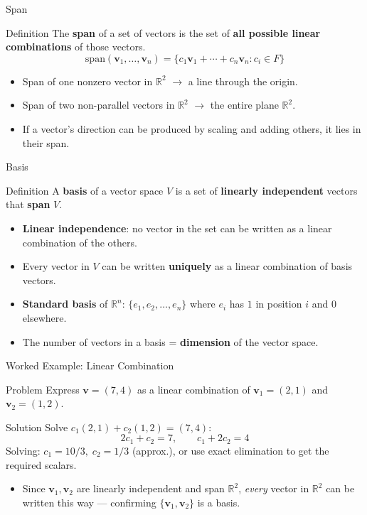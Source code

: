 \documentclass[9pt,aspectratio=169]{beamer}
\newcommand{\R}{\mathbb{R}}
\newcommand{\vect}[1]{\mathbf{#1}}
\begin{document}
\begin{frame}{Span}
\begin{block}{Definition}
The \textbf{span} of a set of vectors is the set of \textbf{all possible linear combinations} of those vectors.
$$\text{span}(\vect{v}_1,\dots,\vect{v}_n) = \{c_1\vect{v}_1+\cdots+c_n\vect{v}_n : c_i \in F\}$$
\end{block}
\begin{itemize}
\item Span of one nonzero vector in $\R^2$ $\to$ a line through the origin.
\item Span of two non-parallel vectors in $\R^2$ $\to$ the entire plane $\R^2$.
\item If a vector's direction can be produced by scaling and adding others, it lies in their span.
\end{itemize}
\end{frame}

\begin{frame}{Basis}
\begin{block}{Definition}
A \textbf{basis} of a vector space $V$ is a set of \textbf{linearly independent} vectors that \textbf{span} $V$.
\end{block}
\begin{itemize}
\item \textbf{Linear independence}: no vector in the set can be written as a linear combination of the others.
\item Every vector in $V$ can be written \textbf{uniquely} as a linear combination of basis vectors.
\item \textbf{Standard basis} of $\R^n$: $\{e_1, e_2, \dots, e_n\}$ where $e_i$ has $1$ in position $i$ and $0$ elsewhere.
\item The number of vectors in a basis = \textbf{dimension} of the vector space.
\end{itemize}
\end{frame}

\begin{frame}{Worked Example: Linear Combination}
\begin{exampleblock}{Problem}
Express $\vect{v}=(7,4)$ as a linear combination of $\vect{v}_1=(2,1)$ and $\vect{v}_2=(1,2)$.
\end{exampleblock}
\begin{block}{Solution}
Solve $c_1(2,1)+c_2(1,2) = (7,4)$:
$$2c_1+c_2 = 7, \qquad c_1+2c_2 = 4$$
Solving: $c_1 = 10/3,\; c_2 = 1/3$ (approx.), or use exact elimination to get the required scalars.
\end{block}
\begin{itemize}
\item Since $\vect{v}_1,\vect{v}_2$ are linearly independent and span $\R^2$, \emph{every} vector in $\R^2$ can be written this way — confirming $\{\vect{v}_1,\vect{v}_2\}$ is a basis.
\end{itemize}
\end{frame}
\end{document}
